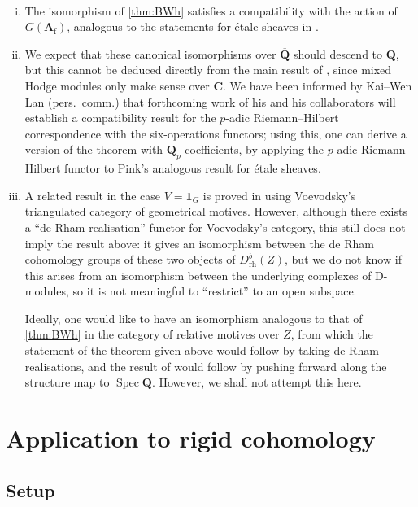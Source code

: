 \documentclass[cjm]{ipart}
\theoremstyle{plain}
\theoremstyle{remark}
\DeclareMathOperator{\Spec}{Spec}
\newcommand{\Af}{\AA_{\mathrm{f}}}
\newcommand{\CC}{\mathbf{C}}
\newcommand{\QQbar}{\overline{\QQ}}
\newcommand{\QQ}{\mathbf{Q}}
\newcommand{\Qp}{\QQ_p}
\renewcommand{\AA}{\mathbf{A}}
\numberwithin{equation}{subsection}
\begin{document}
 \begin{remark} \
  \begin{enumerate}[(i)]
   \item The isomorphism of \cref{thm:BWh} satisfies a compatibility with the action of $G(\Af)$, analogous to the statements for \'etale sheaves in \cite[\S 4.8]{pink92}.

   \item We expect that these canonical isomorphisms over $\QQbar$ should descend to $\QQ$, but this cannot be deduced directly from the main result of \cite{burgoswildeshaus04}, since mixed Hodge modules only make sense over $\CC$. We have been informed by Kai--Wen Lan (pers.~comm.) that forthcoming work of his and his collaborators will establish a compatibility result for the $p$-adic Riemann--Hilbert correspondence with the six-operations functors; using this, one can derive a version of the theorem with $\Qp$-coefficients, by applying the $p$-adic Riemann--Hilbert functor to Pink's analogous result for \'etale sheaves.

   \item A related result in the case $V = \mathbf{1}_G$ is proved in \cite{wildeshaus07} using Voevodsky's triangulated category of geometrical motives. However, although there exists a ``de Rham realisation'' functor for Voevodsky's category, this still does not imply the result above: it gives an isomorphism between the de Rham cohomology groups of these two objects of $D^b_{\mathrm{rh}}(Z)$, but we do not know if this arises from an isomorphism between the underlying complexes of D-modules, so it is not meaningful to ``restrict'' to an open subspace.

   Ideally, one would like to have an isomorphism analogous to that of \cref{thm:BWh} in the category of relative motives over $Z$, from which the statement of the theorem given above would follow by taking de Rham realisations, and the result of \cite{wildeshaus07} would follow by pushing forward along the structure map to $\Spec \QQ$. However, we shall not attempt this here.\qedhere
  \end{enumerate}
 \end{remark}

\section{Application to rigid cohomology}
 \label{sect:forgetsupports}
 \subsection{Setup}
 
\end{document}
